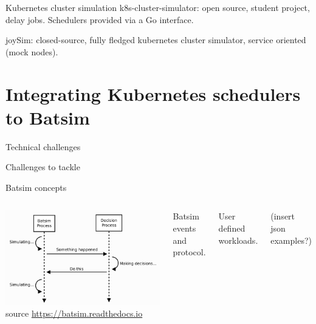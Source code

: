 \documentclass[12pt, aspectratio=43]{beamer}
\begin{document}
\begin{frame}{Kubernetes cluster simulation}
	k8s-cluster-simulator: open source, student project, delay jobs.
	Schedulers provided via a Go interface.

	joySim: closed-source, fully fledged kubernetes cluster simulator,
	service oriented (mock nodes).
\end{frame}

\section{Integrating Kubernetes schedulers to Batsim}

\begin{frame}{Technical challenges}
	\begin{alertblock}{Challenges to tackle}
		\begin{enumerate}
		\end{enumerate}
	\end{alertblock}
\end{frame}

\begin{frame}{Batsim concepts}
	\begin{columns}
		\centering
		\includegraphics[width=\textwidth]{../imgs/batsim-sequence-diag.png}
		\tiny{source \url{https://batsim.readthedocs.io}}

		Batsim events and protocol.

		User defined workloads.

		(insert json examples?)
\end{columns}
\end{frame}
\end{document}
